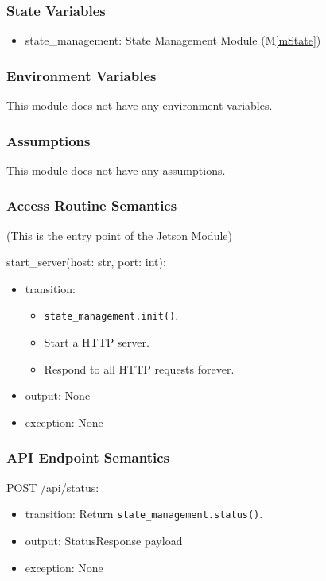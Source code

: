 \documentclass[12pt, titlepage]{article}
\newcommand{\mref}[1]{M\ref{#1}}
\begin{document}
\subsubsection{State Variables}

\begin{itemize}
  \item state\_management: State Management Module (\mref{mState})
\end{itemize}

\subsubsection{Environment Variables}

This module does not have any environment variables.

\subsubsection{Assumptions}

This module does not have any assumptions.

\subsubsection{Access Routine Semantics}

(This is the entry point of the Jetson Module)

\noindent start\_server(host: str, port: int):
\begin{itemize}
  \item transition:
        \begin{itemize}
          \item \texttt{state\_management.init()}.
          \item Start a HTTP server.
          \item Respond to all HTTP requests forever.
        \end{itemize}
  \item output: None
  \item exception: None
\end{itemize}

\subsubsection{API Endpoint Semantics}

\noindent POST /api/status:
\begin{itemize}
  \item transition: Return \texttt{state\_management.status()}.
  \item output: StatusResponse payload
  \item exception: None
\end{itemize}
\end{document}
